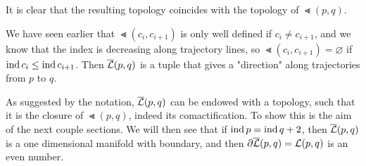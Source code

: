 It is clear  that the resulting topology coincides with the topology
of $\Lt(p, q)$. 

\begin{remark}
    We have seen earlier that $\Lt(c_i, c_{i+1})$ is only well defined if 
    $c_i \neq c_{i + 1}$, and we know that the index is decreasing along trajectory lines,
    so $\Lt(c_i, c_{i+1}) = \varnothing$ if ${ \operatorname{ind} } \, c_i \leq { \operatorname{ind} } \, c_{i + 1}$.
    Then ${\overline{\mathcal{L}} }(p, q)$ is a tuple that gives a "direction" along trajectories
    from $p$ to $q$.
\end{remark}

As suggested by the notation, ${\overline{\mathcal{L}} }(p, q)$ can be endowed with a topology, such that 
it is the closure of $\Lt(p, q)$, indeed its comactification. 
To show this is the aim of the next couple sections. We will then see that if 
${ \operatorname{ind} } \, p = { \operatorname{ind} } \, q + 2$, then ${\overline{\mathcal{L}} }(p, q)$ is a one dimensional manifold with
boundary, and then ${ \partial } {\overline{\mathcal{L}} } (p, q) = { \mathcal{L} } (p, q)$ is an even number.
